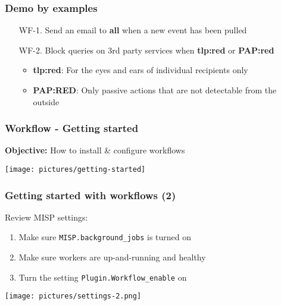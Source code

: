 \begin{frame}
    \frametitle{Demo by examples}
    \begin{enumerate}
        \item[WF-1.] Send an email to \textbf{all} when a new event has been pulled
        \vspace*{2em}
        \item[WF-2.] Block queries on 3rd party services when \textbf{tlp:red} or \textbf{PAP:red}
        \begin{itemize}
            \item \textbf{tlp:red}: For the eyes and ears of individual recipients only
            \item \textbf{PAP:RED}: Only passive actions that are not detectable from the outside
        \end{itemize}
    \end{enumerate}
\end{frame}

\begin{frame}
    \frametitle{
        \huge
        Workflow - Getting started
        \vspace{1em}
    }
    \textbf{Objective:} How to install \& configure workflows
    \begin{center}
        \texttt{[image: pictures/getting-started]}
    \end{center}
\end{frame}

\begin{frame}
    \frametitle{Getting started with workflows (2)}
    Review MISP settings:
    \begin{enumerate}
        \item Make sure \texttt{MISP.background\_jobs} is turned on
        \item Make sure workers are up-and-running and healthy
        \item Turn the setting \texttt{Plugin.Workflow\_enable} on
    \end{enumerate}
    \begin{center}
        \texttt{[image: pictures/settings-2.png]}
    \end{center}
\end{frame}

